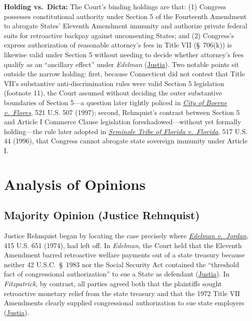 \documentclass[12pt]{article}
\begin{document}
\textbf{Holding vs.\ Dicta:} The Court's binding holdings are that: (1) Congress possesses constitutional authority under Section 5 of the Fourteenth Amendment to abrogate States' Eleventh Amendment immunity and authorize private federal suits for retroactive backpay against unconsenting States; and (2) Congress's express authorization of reasonable attorney's fees in Title VII (\S~706(k)) is likewise valid under Section 5 without needing to decide whether attorney's fees qualify as an ``ancillary effect'' under \textit{Edelman} (\href{https://supreme.justia.com/cases/federal/us/427/445/}{Justia}). Two notable points sit outside the narrow holding: first, because Connecticut did not contest that Title VII's substantive anti-discrimination rules were valid Section 5 legislation (footnote 11), the Court assumed without deciding the outer substantive boundaries of Section 5---a question later tightly policed in \href{https://supreme.justia.com/cases/federal/us/521/507/}{\textit{City of Boerne v.\ Flores}}, 521 U.S. 507 (1997); second, Rehnquist's contrast between Section 5 and Article I Commerce Clause legislation foreshadowed---without yet formally holding---the rule later adopted in \href{https://supreme.justia.com/cases/federal/us/517/44/}{\textit{Seminole Tribe of Florida v.\ Florida}}, 517 U.S. 44 (1996), that Congress cannot abrogate state sovereign immunity under Article I.

\section{Analysis of Opinions}

\subsection{Majority Opinion (Justice Rehnquist)}

Justice Rehnquist began by locating the case precisely where \href{https://supreme.justia.com/cases/federal/us/415/651/}{\textit{Edelman v.\ Jordan}}, 415 U.S. 651 (1974), had left off. In \textit{Edelman}, the Court held that the Eleventh Amendment barred retroactive welfare payments out of a state treasury because neither 42 U.S.C.\ \S~1983 nor the Social Security Act contained the ``threshold fact of congressional authorization'' to sue a State as defendant (\href{https://supreme.justia.com/cases/federal/us/427/445/}{Justia}). In \textit{Fitzpatrick}, by contrast, all parties agreed both that the plaintiffs sought retroactive monetary relief from the state treasury and that the 1972 Title VII Amendments clearly supplied congressional authorization to sue state employers (\href{https://supreme.justia.com/cases/federal/us/427/445/}{Justia}).
\end{document}
